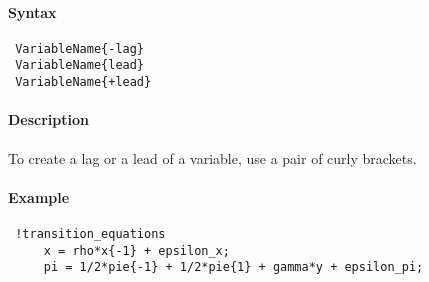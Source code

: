 


	\paragraph{Syntax}
 
 \begin{verbatim}
 VariableName{-lag}
 VariableName{lead}
 VariableName{+lead}
 \end{verbatim}
 
 \paragraph{Description}
 
 To create a lag or a lead of a variable, use a pair of curly brackets.
 
 \paragraph{Example}
 
 \begin{verbatim}
 !transition_equations
     x = rho*x{-1} + epsilon_x;
     pi = 1/2*pie{-1} + 1/2*pie{1} + gamma*y + epsilon_pi;
 \end{verbatim}


